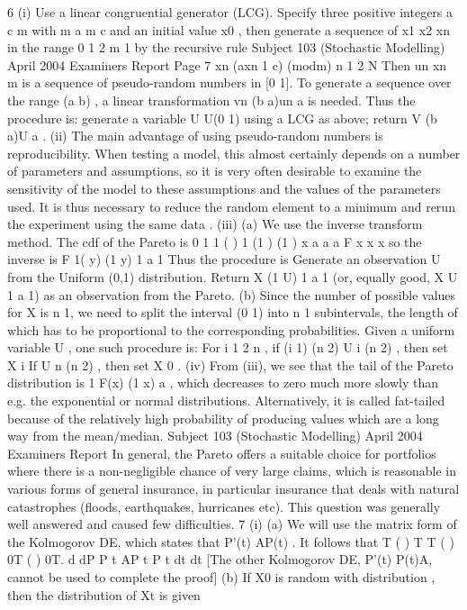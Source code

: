 6 (i) Use a linear congruential generator (LCG). Specify three positive integers
a c m with m a m c and an initial value x0 , then generate a sequence of
x1 x2 xn in the range {0 1 2 m 1} by the recursive rule
Subject 103 (Stochastic Modelling) April 2004 Examiners Report
Page 7
xn (axn 1 c) (modm) n 1 2 N
Then un xn m is a sequence of pseudo-random numbers in [0 1].
To generate a sequence over the range (a b) , a linear transformation
vn (b a)un a is needed. Thus the procedure is: generate a variable
U U(0 1) using a LCG as above; return V (b a)U a .
(ii) The main advantage of using pseudo-random numbers is reproducibility.
When testing a model, this almost certainly depends on a number of
parameters and assumptions, so it is very often desirable to examine the
sensitivity of the model to these assumptions and the values of the parameters
used. It is thus necessary to reduce the random element to a minimum and
rerun the experiment using the same data .
(iii) (a) We use the inverse transform method. The cdf of the Pareto is
0 1
1
( ) 1
(1 ) (1 )
x
a a
a
F x
x x
so the inverse is
F 1( y) (1 y) 1 a 1
Thus the procedure is
Generate an observation U from the Uniform (0,1) distribution.
Return X (1 U) 1 a 1 (or, equally good, X U 1 a 1) as an
observation from the Pareto.
(b) Since the number of possible values for X is n 1, we need to split
the interval (0 1) into n 1 subintervals, the length of which has to be
proportional to the corresponding probabilities. Given a uniform
variable U , one such procedure is:
For i 1 2 n , if (i 1) (n 2) U i (n 2) , then set X i
If U n (n 2) , then set X 0 .
(iv) From (iii), we see that the tail of the Pareto distribution is 1 F(x) (1 x) a ,
which decreases to zero much more slowly than e.g. the exponential or normal
distributions.
Alternatively, it is called fat-tailed because of the relatively high probability
of producing values which are a long way from the mean/median.
Subject 103 (Stochastic Modelling) April 2004 Examiners Report
In general, the Pareto offers a suitable choice for portfolios where there is a
non-negligible chance of very large claims, which is reasonable in various
forms of general insurance, in particular insurance that deals with natural
catastrophes (floods, earthquakes, hurricanes etc).
This question was generally well answered and caused few difficulties.
7 (i) (a) We will use the matrix form of the Kolmogorov DE, which states that
P'(t) AP(t) .
It follows that T ( ) T T ( ) 0T ( ) 0T. d dP
P t AP t P t
dt dt
[The other Kolmogorov DE, P'(t) P(t)A, cannot be used to complete the proof]
(b) If X0 is random with distribution , then the distribution of Xt is given
